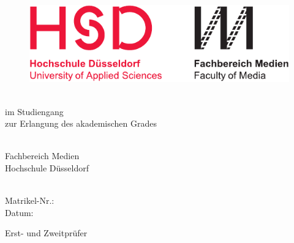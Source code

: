 \thispagestyle{empty}

\begin{figure}
  \flushleft %
  \includegraphics[width=.5\textwidth]{figures/hsd_m_logo.pdf}
\end{figure}

\vspace*{12ex}

\hfill
\begin{minipage}{.8\textwidth}
  \begin{flushright}
    
    {\Huge\bfseries\DocumentThesisTitle\par}
    
    \vspace*{2ex}		
    
    {\large\DocumentThesisSubtitle}
    
    \vspace*{12ex}
    
    \onehalfspacing
    
    \textbf{\DocumentThesisType}\\
    \vspace*{1ex}
    im Studiengang \DocumentThesisCourse\\
    zur Erlangung des akademischen Grades\\
    \DocumentThesisDegree\\
    
    \vspace*{8ex}
    
    Fachbereich Medien\\
    Hochschule Düsseldorf
    
    \vspace*{12ex}
    
    \DocumentAuthorPrename\ \DocumentAuthorName\\
    Matrikel-Nr.: \DocumentThesisMatr\\
    Datum: \DocumentThesisDateCover
    
    \vspace*{12ex}
    
    Erst- und Zweitprüfer\\
    \vspace*{1ex}
    \DocumentThesisFirstExaminer\\
    \DocumentThesisSecondExaminer
    
  \end{flushright}
\end{minipage}
